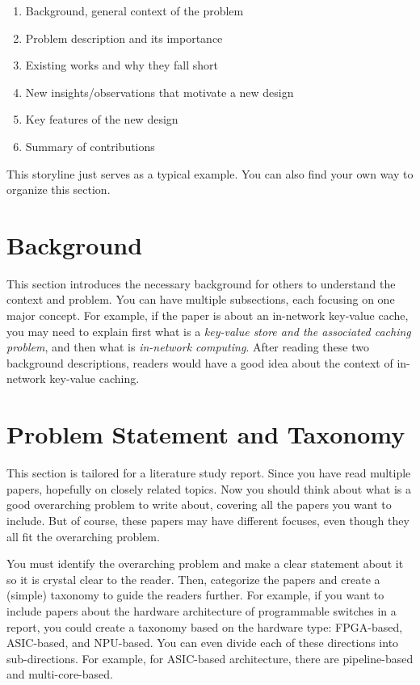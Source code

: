 \documentclass{upb-cn}
\begin{document}
\begin{enumerate}
    \item Background, general context of the problem
    \item Problem description and its importance
    \item Existing works and why they fall short
    \item New insights/observations that motivate a new design
    \item Key features of the new design
    \item Summary of contributions
\end{enumerate}

This storyline just serves as a typical example. You can also find your own way to organize this section. 



\section{Background}
\label{sec:background}

This section introduces the necessary background for others to understand the context and problem. You can have multiple subsections, each focusing on one major concept. For example, if the paper is about an in-network key-value cache, you may need to explain first what is a \emph{key-value store and the associated caching problem}, and then what is \emph{in-network computing}. After reading these two background descriptions, readers would have a good idea about the context of in-network key-value caching.


\section{Problem Statement and Taxonomy}
\label{sec:problem}

This section is tailored for a literature study report. Since you have read multiple papers, hopefully on closely related topics. Now you should think about what is a good overarching problem to write about, covering all the papers you want to include. But of course, these papers may have different focuses, even though they all fit the overarching problem.

You must identify the overarching problem and make a clear statement about it so it is crystal clear to the reader. Then, categorize the papers and create a (simple) taxonomy to guide the readers further. For example, if you want to include papers about the hardware architecture of programmable switches in a report, you could create a taxonomy based on the hardware type: FPGA-based, ASIC-based, and NPU-based. You can even divide each of these directions into sub-directions. For example, for ASIC-based architecture, there are pipeline-based and multi-core-based.  
\end{document}
